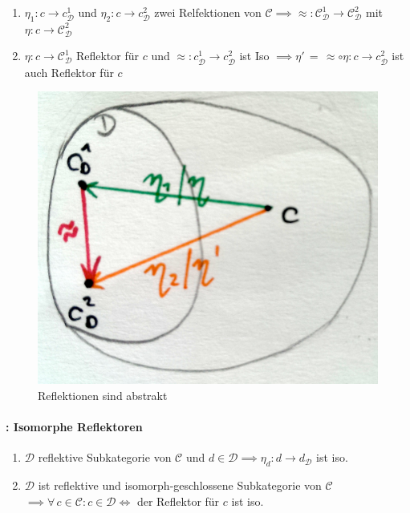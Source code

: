 \begin{enumerate}
\item $\eta_1: c \rightarrow c_\mathcal{D}^1 $ und $\eta_2: c \rightarrow c_\mathcal{D}^2 $ zwei Relfektionen von $\mathcal{C} \implies \approx: \mathcal{C}_\mathcal{D}^1 \rightarrow \mathcal{C}_\mathcal{D}^2 $ mit $\eta: c \rightarrow \mathcal{C}_\mathcal{D}^2$
\item  $\eta: c \rightarrow \mathcal{C}_\mathcal{D}^1$ Reflektor für $c$ und $\approx: c_\mathcal{D}^1 \rightarrow c_\mathcal{D}^2$ ist Iso $\implies \eta' \, = \, \approx \circ \eta : c \rightarrow c_\mathcal{D}^2$ ist auch Reflektor für $c$
\end{enumerate}

\begin{figure}[h]
\noindent \centering{}\includegraphics[scale=0.1]{Abbildungen/154}\caption{Reflektionen sind abstrakt}
\end{figure}

\paragraph{: Isomorphe Reflektoren}
 
\begin{enumerate}
\item  $\mathcal{D} $ reflektive Subkategorie von $\mathcal{C} $ und $d \in \mathcal{D} \implies \eta_d : d \rightarrow d_\mathcal{D}$ ist iso.
\item  $\mathcal{D} $ ist reflektive und isomorph-geschlossene Subkategorie von $\mathcal{C}$ \\ $ \implies \forall \, c \in \mathcal{C}: c \in \mathcal{D} \Leftrightarrow $ der Reflektor für $c$ ist iso.  
\end{enumerate}

